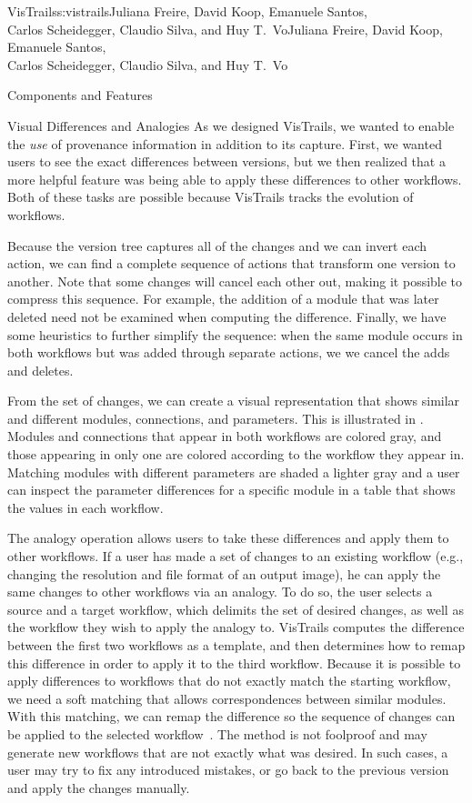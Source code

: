\begin{aosachaptertoc}{VisTrails}{s:vistrails}{Juliana Freire, David Koop, Emanuele Santos, \\ Carlos Scheidegger, Claudio Silva, and Huy T.\ Vo}{Juliana Freire, David Koop, Emanuele Santos, \\ \hspace*{0.9cm} Carlos Scheidegger, Claudio Silva, and Huy T.\ Vo}
\begin{aosasect1}{Components and Features}
\begin{aosasect2}{Visual Differences and Analogies}
As we designed VisTrails, we wanted to enable the \emph{use} of
provenance information in addition to its capture.  First, we wanted
users to see the exact differences between versions, but we then realized that
a more helpful feature was being able to apply these differences to other
workflows.  Both of these tasks are possible because VisTrails tracks
the evolution of workflows.

Because the version tree captures all of the changes and we can invert
each action, we can find a complete sequence of actions that transform one
version to another.  Note that some changes will cancel each other
out, making it possible to compress this sequence. For example, the
addition of a module that was later deleted need not be examined when
computing the difference.  Finally, we have some heuristics to further
simplify the sequence: when the same module occurs in both workflows
but was added through separate actions, we we cancel the adds and
deletes.

From the set of changes, we can create a visual representation
that shows similar and different modules, connections, and parameters.
This is illustrated in 
. Modules and connections that
appear in both workflows are colored gray, and those appearing in only
one are colored according to the workflow they appear in.  Matching
modules with different parameters are shaded a lighter gray and a user
can inspect the parameter differences for a specific module in a table
that shows the values in each workflow.

The analogy operation allows users to take these differences and apply
them to other workflows.  If a user has made a set of changes to an
existing workflow (e.g., changing the resolution and file format of an
output image), he can apply the same changes to other workflows via an
analogy.  To do so, the user selects a source and a target workflow,
which delimits the set of desired changes, as well as the workflow
they wish to apply the analogy to.  VisTrails computes the difference
between the first two workflows as a template, and then determines 
how to remap this difference in order to apply it to the third
workflow.  Because it is possible to apply differences to workflows
that do not exactly match the starting workflow, we need a soft
matching that allows correspondences between similar modules.  With
this matching, we can remap the difference so the sequence of changes
can be applied to the selected
workflow~\cite{bib:scheidegger:analogy}.  The method is not foolproof
and may generate new workflows that are not exactly what was desired.
In such cases, a user may try to fix any introduced mistakes, or go
back to the previous version and apply the changes manually.


\end{aosasect2}
\end{aosasect1}
\end{aosachaptertoc}
